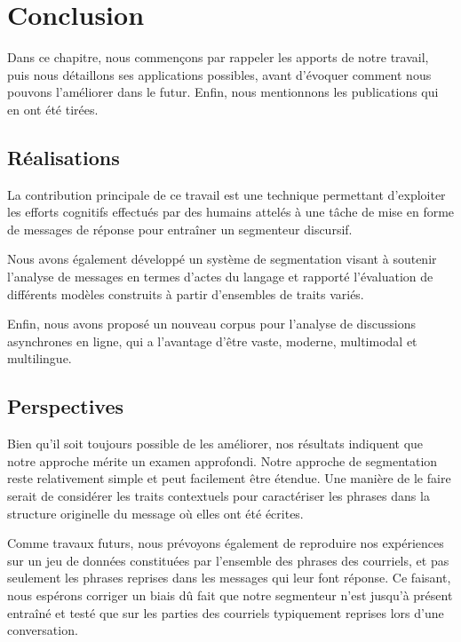 
\chapter{Conclusion}

\label{ch:conclusions}

Dans ce chapitre, nous commençons par rappeler les apports de notre travail, puis nous détaillons ses applications possibles, avant d'évoquer comment nous pouvons l'améliorer dans le futur. Enfin, nous mentionnons les publications qui en ont été tirées.

\section{Réalisations}

La contribution principale de ce travail est une technique permettant d'exploiter les efforts cognitifs effectués par des humains attelés à une tâche de mise en forme de messages de réponse pour entraîner un segmenteur discursif.

Nous avons également développé un système de segmentation visant à soutenir l'analyse de messages en termes d'actes du langage et rapporté l'évaluation de différents modèles construits à partir d'ensembles de traits variés.

Enfin, nous avons proposé un nouveau corpus pour l'analyse de discussions asynchrones en ligne, qui a l'avantage d'être vaste, moderne, multimodal et multilingue.

\section{Perspectives}

Bien qu'il soit toujours possible de les améliorer, nos résultats indiquent que notre approche mérite un examen approfondi. Notre approche de segmentation reste relativement simple et peut facilement être étendue. Une manière de le faire serait de considérer les traits contextuels pour caractériser les phrases dans la structure originelle du message où elles ont été écrites.

Comme travaux futurs, nous prévoyons également de reproduire nos expériences sur un jeu de données constituées par l'ensemble des phrases des courriels, et pas seulement les phrases reprises dans les messages qui leur font réponse. Ce faisant, nous espérons corriger un biais dû fait que notre segmenteur n'est jusqu'à présent entraîné et testé que sur les parties des courriels typiquement reprises lors d'une conversation.

